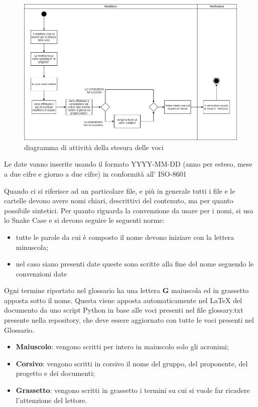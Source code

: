 	    \begin{figure}[hbt!]
	       \centering \includegraphics[width=1.0\textwidth]{_template/images/vociDocumenti.png}
	        \caption{diagramma di attività della stesura delle voci}
	    \end{figure}
	     
	    Le date vanno inserite usando il formato YYYY-MM-DD (anno per esteso, mese a due cifre e giorno a due cifre) in conformità all' ISO-8601
	    
	    Quando ci si riferisce ad un particolare file, e più in generale tutti i file e le cartelle devono avere nomi chiari, descrittivi del contenuto, ma per quanto possibile sintetici.
	    Per quanto riguarda la convenzione da usare per i nomi, si usa lo Snake Case e si devono seguire le seguenti norme:
	    \begin{itemize}
	        \item tutte le parole da cui è composto il nome devono iniziare con la lettera minuscola;
	        \item nel caso siano presenti date queste sono scritte alla fine del nome seguendo le convenzioni date
	    \end{itemize}
	    
	    Ogni termine riportato nel glossario ha una lettera \textbf{G} maiuscola ed in grassetto apposta sotto il nome. Questa viene apposta automaticamente nel LaTeX del documento da uno script Python in base alle voci presenti nel file glossary.txt presente nella repository, che deve essere aggiornato con tutte le voci presenti nel Glossario.
	    
	    \begin{itemize}
	        \item \textbf{Maiuscolo}: vengono scritti per intero in maiuscolo solo gli acronimi;
	        \item \textbf{Corsivo}: vengono scritti in corsivo il nome del gruppo, del proponente, del progetto e dei documenti;
	        \item \textbf{Grassetto}: vengono scritti in grassetto i termini su cui si vuole far ricadere l'attenzione del lettore.
	    \end{itemize}
	    
